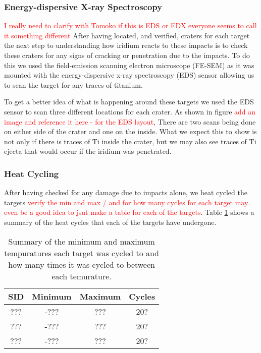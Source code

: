 \documentclass[review]{elsarticle}
\begin{document}
			\subsubsection{Energy-dispersive X-ray Spectroscopy} 
			\textcolor{red}{I really need to clarify with Tomoko if this is EDS or EDX everyone seems to call it something different}
			After having located, and verified, craters for each target the next step to understanding how iridium reacts to these impacts is to check these craters for any
			signs of cracking or penetration due to the impacts. To do this we used the field-emission scanning electron microscope (FE-SEM) as it was mounted with the energy-dispersive
			x-ray spectroscopy (EDS) sensor allowing us to scan the target for any traces of titanium.

			To get a better idea of what is happening around these targets we used the EDS sensor to scan three different locations for each crater. As shown in figure
			\textcolor{red}{add an image and reference it here - for the EDS layout}, There are two scans being done on either side of the crater and one on the inside. What 
			we expect this to show is not only if there is traces of Ti inside the crater, but we may also see traces of Ti ejecta that would occur if the iridium was 
			penetrated. 

			\subsubsection{Heat Cycling}
			After having checked for any damage due to impacts alone, we heat cycled the targets \textcolor{red}{verify the min and max / and for how many cycles for each target
			may even be a good idea to jsut make a table for each of the targets}. Table \ref{tab: heatCycles} shows a summary of the heat cycles that each of the targets have undergone. 

			\begin{table}
				\begin{center}
					\begin{tabular}{c|c|c|c}
					SID		& Minimum & Maximum & Cycles \\\hline
					???		& -???	  & ???		& 20?	 \\\hline
					???		& -???	  & ???		& 20?	 \\\hline
					???		& -???	  & ???		& 20?	 \\

					\end{tabular}
				\end{center}
			\caption
			{
				\label{tab: heatCycles}
				Summary of the minimum and maximum tempuratures each target was cycled to and how many times it was cycled to between each temurature.
			}
			\end{table}
\end{document}
